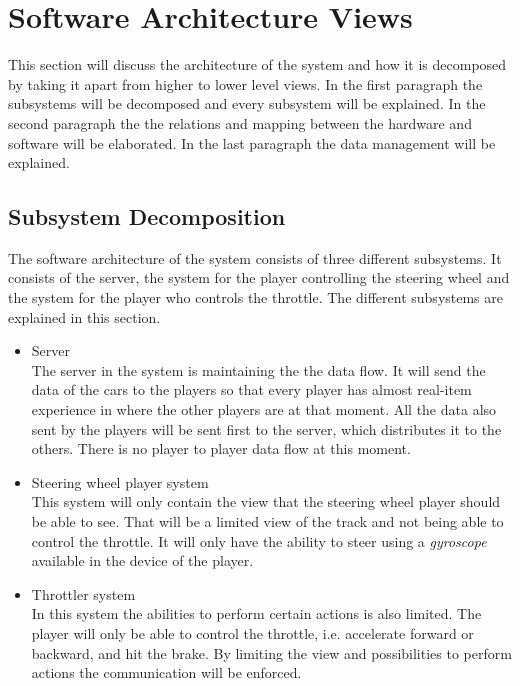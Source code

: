 \documentclass[11pt,twoside,a4paper]{article}
\begin{document}
\newpage


\section{Software Architecture Views}
This section will discuss the architecture of the system and how it is decomposed by taking it apart from higher to lower level views. In the first paragraph the subsystems will be decomposed and every subsystem will be explained. In the second paragraph the the relations and mapping between the hardware and software will be elaborated. In the last paragraph the data management will be explained.


\subsection{Subsystem Decomposition}
The software architecture of the system consists of three different subsystems. It consists of the server, the system for the player controlling the steering wheel and the system for the player who controls the throttle. The different subsystems are explained in this section.

\begin{itemize}
\item Server \hfill \\
    The server in the system is maintaining the the data flow. It will send the data of the cars to the players so that every player has almost real-item experience in where the other players are at that moment. All the data also sent by the players will be sent first to the server, which distributes it to the others. There is no player to player data flow at this moment.
\item Steering wheel player system \hfill \\
    This system will only contain the view that the steering wheel player should be able to see. That will be a limited view of the track and not being able to control the throttle. It will only have the ability to steer using a \emph{gyroscope} available in the device of the player.
\item Throttler system \hfill \\
    In this system the abilities to perform certain actions is also limited. The player will only be able to control the throttle, i.e. accelerate forward or backward, and hit the brake. By limiting the view and possibilities to perform actions the communication will be enforced. \\
\end{itemize}
\end{document}
